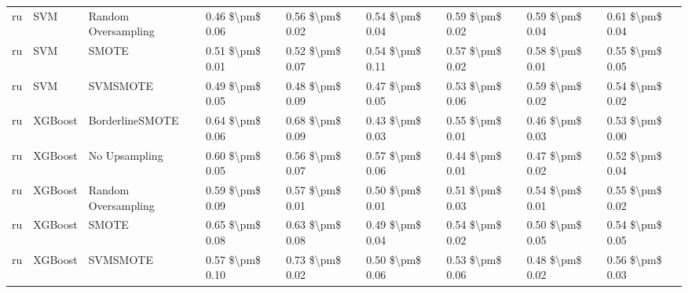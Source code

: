 \begin{tabular}{lllllllll}
      ru &                             SVM &           Random Oversampling &     0.46 \$\textbackslash pm\$ 0.06 &           0.56 \$\textbackslash pm\$ 0.02 &       0.54 \$\textbackslash pm\$ 0.04 &        0.59 \$\textbackslash pm\$ 0.02 &                         0.59 \$\textbackslash pm\$ 0.04 &     0.61 \$\textbackslash pm\$ 0.04 \\
      ru &                             SVM &                         SMOTE &     0.51 \$\textbackslash pm\$ 0.01 &           0.52 \$\textbackslash pm\$ 0.07 &       0.54 \$\textbackslash pm\$ 0.11 &        0.57 \$\textbackslash pm\$ 0.02 &                         0.58 \$\textbackslash pm\$ 0.01 &     0.55 \$\textbackslash pm\$ 0.05 \\
      ru &                             SVM &                      SVMSMOTE &     0.49 \$\textbackslash pm\$ 0.05 &           0.48 \$\textbackslash pm\$ 0.09 &       0.47 \$\textbackslash pm\$ 0.05 &        0.53 \$\textbackslash pm\$ 0.06 &                         0.59 \$\textbackslash pm\$ 0.02 &     0.54 \$\textbackslash pm\$ 0.02 \\
      ru &                         XGBoost &               BorderlineSMOTE &     0.64 \$\textbackslash pm\$ 0.06 &           0.68 \$\textbackslash pm\$ 0.09 &       0.43 \$\textbackslash pm\$ 0.03 &        0.55 \$\textbackslash pm\$ 0.01 &                         0.46 \$\textbackslash pm\$ 0.03 &     0.53 \$\textbackslash pm\$ 0.00 \\
      ru &                         XGBoost &                 No Upsampling &     0.60 \$\textbackslash pm\$ 0.05 &           0.56 \$\textbackslash pm\$ 0.07 &       0.57 \$\textbackslash pm\$ 0.06 &        0.44 \$\textbackslash pm\$ 0.01 &                         0.47 \$\textbackslash pm\$ 0.02 &     0.52 \$\textbackslash pm\$ 0.04 \\
      ru &                         XGBoost &           Random Oversampling &     0.59 \$\textbackslash pm\$ 0.09 &           0.57 \$\textbackslash pm\$ 0.01 &       0.50 \$\textbackslash pm\$ 0.01 &        0.51 \$\textbackslash pm\$ 0.03 &                         0.54 \$\textbackslash pm\$ 0.01 &     0.55 \$\textbackslash pm\$ 0.02 \\
      ru &                         XGBoost &                         SMOTE &     0.65 \$\textbackslash pm\$ 0.08 &           0.63 \$\textbackslash pm\$ 0.08 &       0.49 \$\textbackslash pm\$ 0.04 &        0.54 \$\textbackslash pm\$ 0.02 &                         0.50 \$\textbackslash pm\$ 0.05 &     0.54 \$\textbackslash pm\$ 0.05 \\
      ru &                         XGBoost &                      SVMSMOTE &     0.57 \$\textbackslash pm\$ 0.10 &           0.73 \$\textbackslash pm\$ 0.02 &       0.50 \$\textbackslash pm\$ 0.06 &        0.53 \$\textbackslash pm\$ 0.06 &                         0.48 \$\textbackslash pm\$ 0.02 &     0.56 \$\textbackslash pm\$ 0.03 \\
\bottomrule
\end{tabular}
